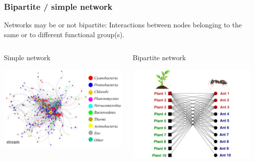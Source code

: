 \documentclass[compress,10pt]{beamer}
\begin{document}
\begin{frame}\frametitle{Bipartite / simple network}


Networks may be or not bipartite: Interactions between nodes belonging to the same or to different functional group(s).


\begin{columns}
 

 \begin{column}{0.5 \textwidth}
 \begin{block}{Simple network}
 
 \begin{center}
 \includegraphics[width=\textwidth]{plots/cooccurrence_network}
 \end{center} 
  \end{block}
 \end{column}

 \begin{column}{0.5 \textwidth}
 \begin{block}{Bipartite network}
 \begin{center}
 \includegraphics[width=\textwidth]{plots/plantant}
\end{center} 
 \end{block}
  \end{column}
\end{columns}


\end{frame}
\end{document}
